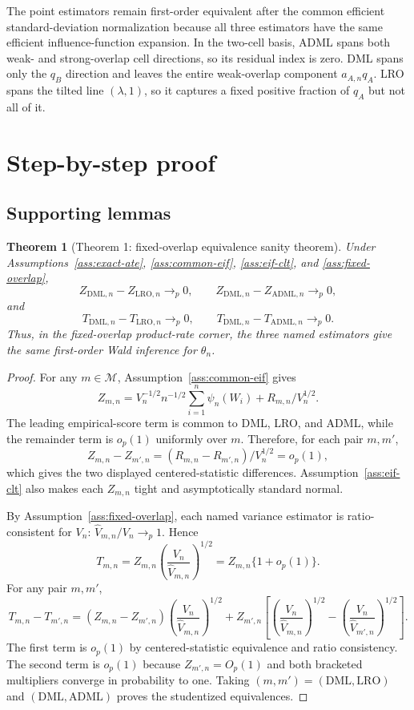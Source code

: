 \documentclass[11pt]{article}
\theoremstyle{definition}
\theoremstyle{plain}
\newtheorem{theorem}{Theorem}
\theoremstyle{remark}
\begin{document}
The point estimators remain first-order equivalent after the common efficient standard-deviation normalization because all three estimators have the same efficient influence-function expansion.  In the two-cell basis, ADML spans both weak- and strong-overlap cell directions, so its residual index is zero.  DML spans only the \(q_B\) direction and leaves the entire weak-overlap component \(a_{A,n}q_A\).  LRO spans the tilted line \((\lambda,1)\), so it captures a fixed positive fraction of \(q_A\) but not all of it.

\section{Step-by-step proof}
\subsection*{Supporting lemmas}
\begin{theorem}[Theorem 1: fixed-overlap equivalence sanity theorem]\label{thm:fixed-overlap}
Under Assumptions~\ref{ass:exact-ate}, \ref{ass:common-eif}, \ref{ass:eif-clt}, and \ref{ass:fixed-overlap},
\[
  Z_{\mathrm{DML},n}-Z_{\mathrm{LRO},n}\to_p0,\qquad
  Z_{\mathrm{DML},n}-Z_{\mathrm{ADML},n}\to_p0,
\]
and
\[
  T_{\mathrm{DML},n}-T_{\mathrm{LRO},n}\to_p0,\qquad
  T_{\mathrm{DML},n}-T_{\mathrm{ADML},n}\to_p0.
\]
Thus, in the fixed-overlap product-rate corner, the three named estimators give the same first-order Wald inference for \(\theta_n\).
\end{theorem}
\begin{proof}
For any \(m\in\mathcal M\), Assumption~\ref{ass:common-eif} gives
\[
  Z_{m,n}=V_n^{-1/2}n^{-1/2}\sum_{i=1}^n\psi_n(W_i)+R_{m,n}/V_n^{1/2}.
\]
The leading empirical-score term is common to DML, LRO, and ADML, while the remainder term is \(o_p(1)\) uniformly over \(m\).  Therefore, for each pair \(m,m'\),
\[
  Z_{m,n}-Z_{m',n}=(R_{m,n}-R_{m',n})/V_n^{1/2}=o_p(1),
\]
which gives the two displayed centered-statistic differences.  Assumption~\ref{ass:eif-clt} also makes each \(Z_{m,n}\) tight and asymptotically standard normal.

By Assumption~\ref{ass:fixed-overlap}, each named variance estimator is ratio-consistent for \(V_n\): \(\hat V_{m,n}/V_n\to_p1\).  Hence
\[
  T_{m,n}=Z_{m,n}\left(\frac{V_n}{\hat V_{m,n}}\right)^{1/2}=Z_{m,n}\{1+o_p(1)\}.
\]
For any pair \(m,m'\),
\[
  T_{m,n}-T_{m',n}
  =(Z_{m,n}-Z_{m',n})\left(\frac{V_n}{\hat V_{m,n}}\right)^{1/2}
  +Z_{m',n}\left[\left(\frac{V_n}{\hat V_{m,n}}\right)^{1/2}-\left(\frac{V_n}{\hat V_{m',n}}\right)^{1/2}\right].
\]
The first term is \(o_p(1)\) by centered-statistic equivalence and ratio consistency.  The second term is \(o_p(1)\) because \(Z_{m',n}=O_p(1)\) and both bracketed multipliers converge in probability to one.  Taking \((m,m')=(\mathrm{DML},\mathrm{LRO})\) and \((\mathrm{DML},\mathrm{ADML})\) proves the studentized equivalences.
\end{proof}
\end{document}
